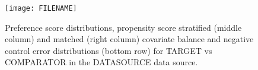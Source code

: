 \begin{figure}[H]
	\caption{Preference score distributions,
	propensity score stratified (middle column) and matched (right column) covariate balance
	and negative control error distributions (bottom row) for
	TARGET vs COMPARATOR in the DATASOURCE data source.}
	\centerline{
  		\texttt{[image: FILENAME]}
  	}
\end{figure}
